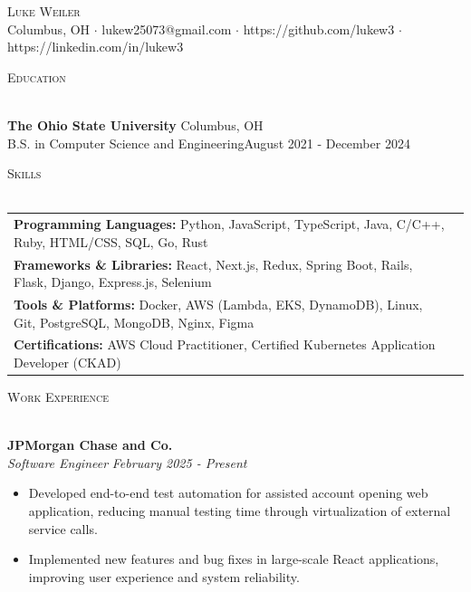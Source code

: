 \documentclass[letterpaper]{article}
\newcommand{\lineunder} {
    \vspace*{-8pt} \\
    \hspace*{-18pt} \hrulefill \\
}
\newcommand{\header} [1] {
    {\hspace*{-18pt}\vspace*{6pt} \textsc{#1}}
    \vspace*{-6pt} \lineunder
}
\begin{document}
\vspace*{-40pt}

\vspace*{-10pt}
\begin{center}
	{\Huge \scshape {Luke Weiler}}\\
	Columbus, OH $\cdot$ lukew25073@gmail.com $\cdot$ https://github.com/lukew3 $\cdot$ https://linkedin.com/in/lukew3\\
\end{center}

\header{Education}
\vspace{1mm}

    \textbf{The Ohio State University} \hfill Columbus, OH\\
    B.S. in Computer Science and Engineering\hfill \hfill August 2021 - December 2024\\
    \vspace{2mm}


\header{Skills}
\vspace{1.5mm}
\hspace{-3mm}
\begin{tabular}{ l l }

    \textbf{Programming Languages:} Python, JavaScript, TypeScript, Java, C/C++, Ruby, HTML/CSS, SQL, Go, Rust \\

    \textbf{Frameworks \& Libraries:} React, Next.js, Redux, Spring Boot, Rails, Flask, Django, Express.js, Selenium  \\

    \textbf{Tools \& Platforms:} Docker, AWS (Lambda, EKS, DynamoDB), Linux, Git, PostgreSQL, MongoDB, Nginx, Figma  \\

    \textbf{Certifications:} AWS Cloud Practitioner, Certified Kubernetes Application Developer (CKAD)  \\

\end{tabular}
\vspace{2mm}

\header{Work Experience}
\vspace{1mm}

    \textbf{JPMorgan Chase and Co.}\\

    \textit{Software Engineer} \hfill \textsl{February 2025 - Present}\\
    \vspace{-7pt}
    \begin{itemize} \itemsep -1mm

            \item Developed end-to-end test automation for assisted account opening web application, reducing manual testing time through virtualization of external service calls.

            \item Implemented new features and bug fixes in large-scale React applications, improving user experience and system reliability.

    \end{itemize}
    \vspace{-2mm}
    
\end{document}
